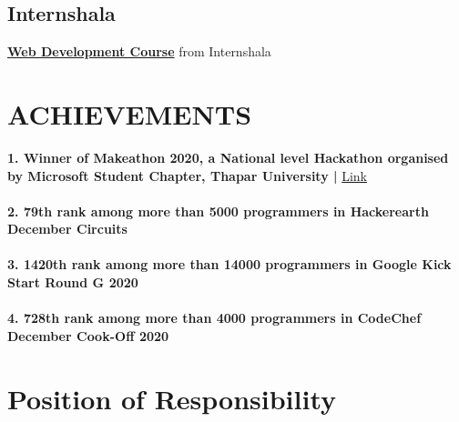 \documentclass[]{deedy-resume-openfont}
\begin{document}
\begin{minipage}[t]{0.33\textwidth}
\subsection{Internshala}
\textbullet{} \textbf{\href{https://drive.google.com/file/d/11gT84KaljHFlw19DHCbYKwLftPTN7b3T/view?usp=sharing}{Web Development Course}} from Internshala
\sectionsep

%
%

\end{minipage} 
\hfill
\begin{minipage}[t]{0.66\textwidth} 


\section{ACHIEVEMENTS}
\textbf{1. Winner of Makeathon 2020, a National level Hackathon organised by Microsoft Student Chapter, Thapar University | } \href{https://drive.google.com/file/d/1jRSi-upKzy0GVTGOstG9chlHbPRT0xO1/view?usp=sharing}{Link}\\\\
\textbf{2. 79th rank among more than 5000 programmers in Hackerearth December Circuits}\\\\
\textbf{3. 1420th rank among more than 14000 programmers in Google Kick Start Round G 2020}\\\\
\textbf{4. 728th rank among more than 4000 programmers in CodeChef December Cook-Off 2020} 

\sectionsep


\section{Position of Responsibility}
\sectionsep

 \\


\end{minipage}
\end{document}
